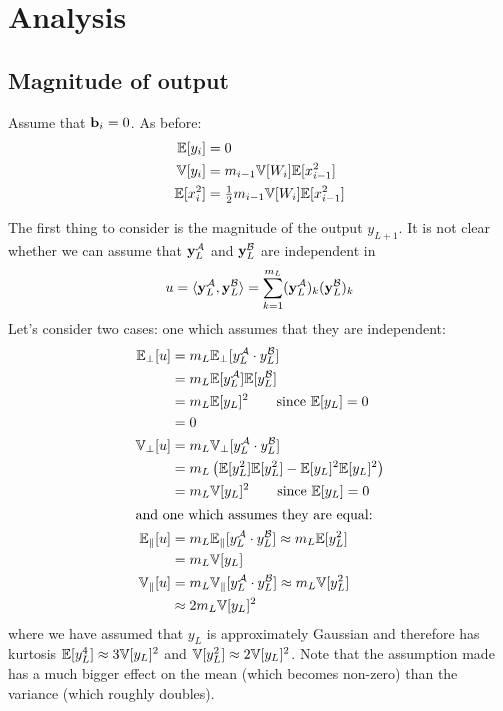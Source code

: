 \section{Analysis}

\subsection{Magnitude of output}

Assume that $\boldsymbol{\mathbf{b}}_{i} = 0$.
As before:
\begin{align}
\E[y_{i}] & = 0 \\
\V[y_{i}] & = m_{i - 1} \V[W_{i}] \E[x_{i - 1}^2] \\ %
\E[x_{i}^2] %
& = \tfrac{1}{2} m_{i - 1} \V[W_{i}] \E[x_{i - 1}^2] %
\end{align}

The first thing to consider is the magnitude of the output $y_{L+1}$.
It is not clear whether we can assume that $\boldsymbol{\mathbf{y}}_{L}^{\mathcal{A}}$ and $\boldsymbol{\mathbf{y}}_{L}^{\mathcal{B}}$ are independent in
\begin{equation}
u = \langle \boldsymbol{\mathbf{y}}_{L}^{\mathcal{A}}, \boldsymbol{\mathbf{y}}_{L}^{\mathcal{B}} \rangle
= \sum_{k = 1}^{m_{L}} (\boldsymbol{\mathbf{y}}_{L}^{\mathcal{A}})_{k} (\boldsymbol{\mathbf{y}}_{L}^{\mathcal{B}})_{k}
\end{equation}
Let's consider two cases: one which assumes that they are independent:
\begin{align}
\mathbb{E}_{\bot}[u] & = m_{L} \mathbb{E}_{\bot}[y_{L}^{\mathcal{A}} \cdot y_{L}^{\mathcal{B}}] \\
& = m_{L} \mathbb{E}[y_{L}^{\mathcal{A}}] \mathbb{E}[y_{L}^{\mathcal{B}}] \\
& = m_{L} \mathbb{E}[y_{L}]^2 \qquad \text{since $\mathbb{E}[y_{L}] = 0$} \\
& = 0 \\
\mathbb{V}_{\bot}[u] & = m_{L} \mathbb{V}_{\bot}[y_{L}^{\mathcal{A}} \cdot y_{L}^{\mathcal{B}}] \\
& = m_{L} \left( \mathbb{E}[y_{L}^2] \mathbb{E}[y_{L}^2] - \mathbb{E}[y_{L}]^2 \mathbb{E}[y_{L}]^2 \right) \\
& = m_{L} \mathbb{V}[y_{L}]^2 \qquad \text{since $\mathbb{E}[y_{L}] = 0$} \\
\intertext{and one which assumes they are equal:}
\mathbb{E}_{\parallel}[u]
& = m_{L} \mathbb{E}_{\parallel}[y_{L}^{\mathcal{A}} \cdot y_{L}^{\mathcal{B}}] \approx m_{L} \mathbb{E}[y_{L}^2] \\
& = m_{L} \mathbb{V}[y_{L}] \\
\mathbb{V}_{\parallel}[u]
& = m_{L} \mathbb{V}_{\parallel}[y_{L}^{\mathcal{A}} \cdot y_{L}^{\mathcal{B}}] \approx m_{L} \mathbb{V}[y_{L}^2] \\
& \approx 2 m_{L} \mathbb{V}[y_{L}]^2
\end{align}
where we have assumed that $y_{L}$ is approximately Gaussian and therefore has kurtosis $\mathbb{E}[y_{L}^4] \approx 3 \mathbb{V}[y_L]^2$ and $\mathbb{V}[y_{L}^2] \approx 2 \mathbb{V}[y_L]^2$.
Note that the assumption made has a much bigger effect on the mean (which becomes non-zero) than the variance (which roughly doubles).


